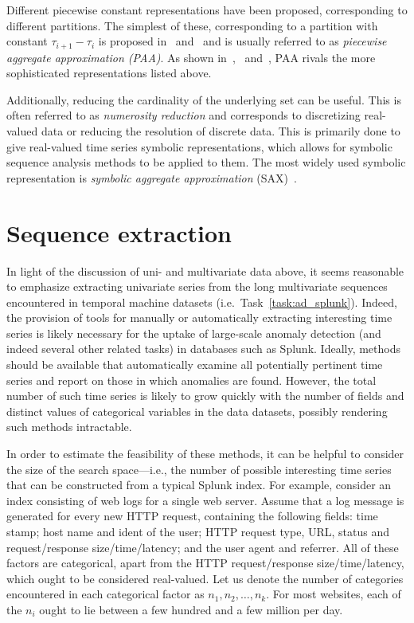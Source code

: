 Different piecewise constant representations have been proposed, corresponding to different partitions. The simplest of these, corresponding to a partition with constant $\tau_{i+1} - \tau_i$ is proposed in~\cite{keogh4} and~\cite{faloutsos2} and is usually referred to as \emph{piecewise aggregate approximation (PAA)}. As shown in~\cite{keogh5},~\cite{keogh3} and~\cite{faloutsos2}, PAA rivals the more sophisticated representations listed above.

Additionally, reducing the cardinality of the underlying set can be useful. This is often referred to as \emph{numerosity reduction} and corresponds to discretizing real-valued data or reducing the resolution of discrete data. This is primarily done to give real-valued time series symbolic representations, which allows for symbolic sequence analysis methods to be applied to them. The most widely used symbolic representation is \emph{symbolic aggregate approximation} (SAX)~\cite{sax}.

\section{Sequence extraction}
\label{sect:series_mining}

In light of the discussion of uni- and multivariate data above, it seems reasonable to emphasize extracting univariate series from the long multivariate sequences encountered in temporal machine datasets (i.e.\ Task~\ref{task:ad_splunk}). Indeed, the provision of tools for manually or automatically extracting interesting time series is likely necessary for the uptake of large-scale anomaly detection (and indeed several other related tasks) in databases such as Splunk. Ideally, methods should be available that automatically examine all potentially pertinent time series and report on those in which anomalies are found. However, the total number of such time series is likely to grow quickly with the number of fields and distinct values of categorical variables in the data datasets, possibly rendering such methods intractable.

In order to estimate the feasibility of these methods, it can be helpful to consider the size of the search space---i.e.\@, the number of possible interesting time series that can be constructed from a typical Splunk index. For example, consider an index consisting of web logs for a single web server. Assume that a log message is generated for every new HTTP request, containing the following fields: time stamp; host name and ident of the user; HTTP request type, URL, status and request/response size/time/latency; and the user agent and referrer. All of these factors are categorical, apart from the HTTP request/response size/time/latency, which ought to be considered real-valued. Let us denote the number of categories encountered in each categorical factor as $n_1, n_2, \dots, n_k$. For most websites, each of the $n_i$ ought to lie between a few hundred and a few million per day.

